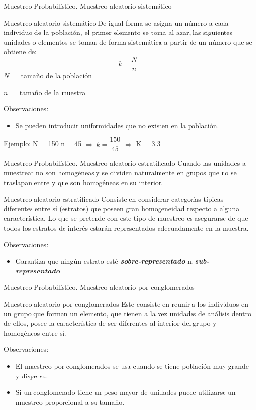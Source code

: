 \documentclass[11pt]{beamer}
\begin{document}
    \begin{frame}{Muestreo Probabilístico. Muestreo aleatorio sistemático }
      \begin{block}{Muestreo aleatorio sistemático }
        De igual forma se asigna un número a cada individuo de la población, el primer elemento se toma al azar, las siguientes unidades o elementos se toman de forma sistemática a partir de un número que se obtiene de:
        $$k = \dfrac{N}{n}$$
        $N =$ tamaño de la población

        $n =$ tamaño de la muestra
      \end{block}
      \pause
      Observaciones:
      \begin{itemize}
        \item Se pueden introducir uniformidades que no existen en la población.
      \end{itemize}
      Ejemplo: N = 150 n = 45 \pause $\Rightarrow$ $k = \dfrac{150}{45}$ \pause $\Rightarrow$ K = 3.3
    \end{frame}


    \begin{frame}{Muestreo Probabilístico. Muestreo aleatorio estratificado }
      Cuando las unidades a muestrear no son homogéneas y se dividen naturalmente en grupos que no se traslapan entre y que son homogéneas en su interior.
      \pause
      \begin{block}{Muestreo aleatorio estratificado }
        Consiste en considerar categorías típicas diferentes entre sí (estratos) que poseen gran homogeneidad respecto a alguna característica. Lo que se pretende con este tipo de muestreo es asegurarse de que todos los estratos de interés estarán representados adecuadamente en la muestra.
      \end{block}
      \pause
      Observaciones:
      \begin{itemize}
          \item Garantiza que ningún estrato esté \textit{\textbf{sobre-representado}} ni \textit{\textbf{sub-representado}}.
      \end{itemize}
    \end{frame}

    \begin{frame}{Muestreo Probabilístico. Muestreo aleatorio por conglomerados}

      \begin{block}{Muestreo aleatorio por conglomerados}
        Este consiste en reunir a los individuos en un grupo que forman un elemento, que tienen a la vez unidades de análisis dentro de ellos, posee la característica de ser diferentes al interior del grupo y homogéneos entre sí.
      \end{block}
      \pause
      Observaciones:
      \begin{itemize}
        \item El muestreo por conglomerados se usa cuando se tiene población muy grande y dispersa.
        \item Si un conglomerado tiene un peso mayor de unidades puede utilizarse un muestreo proporcional a su tamaño.
      \end{itemize}
    \end{frame}
\end{document}
